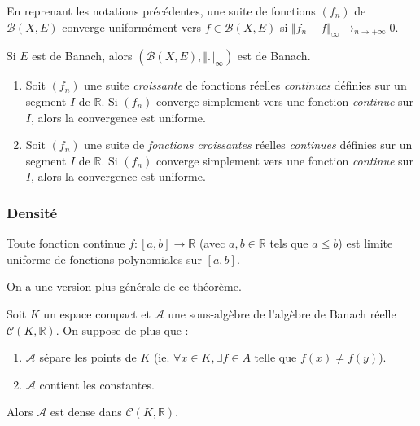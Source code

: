   \begin{proposition}
    En reprenant les notations précédentes, une suite de fonctions $(f_n)$ de $\mathcal{B}(X,E)$ converge uniformément vers $f \in \mathcal{B}(X,E)$ si $\Vert f_n - f \Vert_\infty \longrightarrow_{n \rightarrow +\infty} 0$.
  \end{proposition}

  \begin{proposition}
    Si $E$ est de Banach, alors $(\mathcal{B}(X,E), \Vert . \Vert_\infty)$ est de Banach.
  \end{proposition}


  \begin{theorem}
    \begin{enumerate}[label={\bfseries(\roman*)}]
      \item Soit $(f_n)$ une suite \textit{croissante} de fonctions réelles \textit{continues} définies sur un segment $I$ de $\mathbb{R}$. Si $(f_n)$ converge simplement vers une fonction \textit{continue} sur $I$, alors la convergence est uniforme.
      \item Soit $(f_n)$ une suite de \textit{fonctions croissantes} réelles \textit{continues} définies sur un segment $I$ de $\mathbb{R}$. Si $(f_n)$ converge simplement vers une fonction \textit{continue} sur $I$, alors la convergence est uniforme.
    \end{enumerate}
  \end{theorem}

  \subsubsection{Densité}


  \begin{theorem}
    Toute fonction continue $f : [a,b] \rightarrow \mathbb{R}$ (avec $a, b \in \mathbb{R}$ tels que $a \leq b$) est limite uniforme de fonctions polynomiales sur $[a, b]$.
  \end{theorem}

  On a une version plus générale de ce théorème.


  \begin{theorem}
    Soit $K$ un espace compact et $\mathcal{A}$ une sous-algèbre de l'algèbre de Banach réelle $\mathcal{C}(K, \mathbb{R})$. On suppose de plus que :
    \begin{enumerate}[label={\bfseries(\roman*)}]
      \item $\mathcal{A}$ sépare les points de $K$ (ie. $\forall x \in K, \exists f \in A \text{ telle que } f(x) \neq f(y)$).
      \item $\mathcal{A}$ contient les constantes.
    \end{enumerate}
    Alors $\mathcal{A}$ est dense dans $\mathcal{C}(K, \mathbb{R})$.
  \end{theorem}

